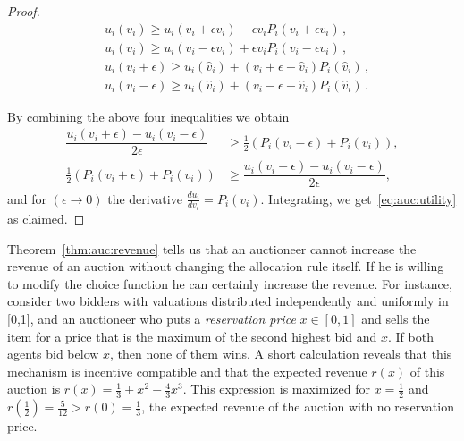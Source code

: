 \begin{proof}
\begin{align*}
&u_i(v_i) \geq u_i(v_i + \epsilon v_i) - \epsilon v_i P_i(v_i + \epsilon v_i)\, ,\\
&u_i(v_i) \geq u_i(v_i - \epsilon v_i) + \epsilon v_i P_i(v_i - \epsilon v_i)\, ,\\
&u_i(v_i+\epsilon) \geq u_i(\hat{v}_i) + (v_i+\epsilon - \hat{v}_i)P_i(\hat{v}_i)\, ,\\
&u_i(v_i-\epsilon) \geq u_i(\hat{v}_i) + (v_i-\epsilon - \hat{v}_i)P_i(\hat{v}_i)\,.
\end{align*}


By combining the above four inequalities we obtain
\begin{align*}
\dfrac{u_i(v_i+ \epsilon)-u_i(v_i- \epsilon)}{2\epsilon} &\geq \frac{1}{2}\left( P_i(v_i-\epsilon)+ P_i(v_i) \right), \\
 \frac{1}{2}\left( P_i(v_i+\epsilon)+ P_i(v_i) \right) &\geq \dfrac{u_i(v_i+ \epsilon)-u_i(v_i- \epsilon)}{2\epsilon},
\end{align*}
and for $(\epsilon \to 0)$ the derivative $\frac{d u_i}{d v_i} = P_i(v_i)$. Integrating, we get~\eqref{eq:auc:utility} as claimed.
\end{proof}

Theorem~\ref{thm:auc:revenue} tells us that an auctioneer cannot increase the revenue of an auction without changing the allocation rule itself. If he is willing to modify the choice function he can certainly increase the revenue. For instance, consider two bidders with valuations distributed independently and uniformly     in [0,1], and an auctioneer who puts a \emph{reservation price} $x \in [0,1]$ and sells the item for a price that is the maximum of the second highest bid and $x$. If both agents bid below $x$, then none of them wins. A short calculation reveals that this mechanism is incentive compatible and that the expected revenue $r(x)$ of this auction is $r(x)=\frac{1}{3} + x^2 - \frac{4}{3} x^3$. This expression is maximized for $x=\frac{1}{2}$ and $r(\frac{1}{2}) = \frac{5}{12} > r(0)=\frac{1}{3}$, the expected revenue of the auction with no reservation price.

